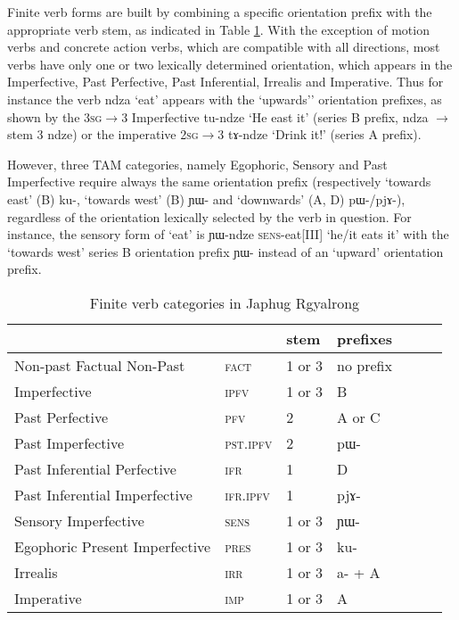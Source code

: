 \documentclass[oldfontcommands,oneside,a4paper,11pt]{article}
\newcommand{\ipa}[1]{\mbox{\phon #1}} %
\begin{document}
Finite verb forms are built by combining a specific orientation prefix with the appropriate verb stem, as indicated in Table \ref{tab:finite.forms}. With the exception of motion verbs and concrete action verbs, which are compatible with all directions, most verbs have only one or two lexically determined orientation, which appears in the Imperfective, Past Perfective, Past Inferential, Irrealis and Imperative. Thus for  instance the verb \ipa{ndza} `eat' appears with the `upwards'' orientation prefixes, as shown by the \textsc{3sg$\rightarrow$3} Imperfective \ipa{tu-ndze} `He east it' (series B prefix, \ipa{ndza} $\rightarrow$ stem 3 \ipa{ndze}) or the imperative \textsc{2sg$\rightarrow$3} \ipa{tɤ-ndze} `Drink it!' (series A prefix).

However, three TAM categories, namely Egophoric, Sensory and Past Imperfective require always the same orientation prefix (respectively `towards east' (B) \ipa{ku-}, `towards west' (B) \ipa{ɲɯ-} and `downwards' (A, D) \ipa{pɯ-}/\ipa{pjɤ-}), regardless of the orientation lexically selected by the verb in question. For instance, the sensory form of `eat' is \ipa{ɲɯ-ndze} \textsc{sens}-eat[III] `he/it eats it' with the `towards west' series B orientation prefix \ipa{ɲɯ-} instead of an `upward' orientation prefix.

\begin{table}[H]
\caption{Finite verb categories in Japhug Rgyalrong} \label{tab:finite.forms} \centering
\begin{tabular}{lllllll}
\toprule
&	&	stem&	prefixes\\
\midrule
Non-past Factual Non-Past&	\textsc{fact} &	1 or 3&	no prefix\\
Imperfective&	\textsc{ipfv} &	1 or 3&	B\\
Past Perfective &	\textsc{pfv} &	2&	A or C\\
Past Imperfective &	\textsc{pst.ipfv} &	2&	\ipa{pɯ-}\\
Past Inferential Perfective &	\textsc{ifr} &	1&	D\\
Past Inferential Imperfective&	\textsc{ifr.ipfv} &	1&	\ipa{pjɤ-}\\
Sensory Imperfective&	\textsc{sens} &	1 or 3&	\ipa{ɲɯ-}\\
Egophoric Present Imperfective&	\textsc{pres} &	1 or 3&	\ipa{ku-}\\
Irrealis&	\textsc{irr} &	1 or 3&	\ipa{a-} + A\\
Imperative&	\textsc{imp} &	1 or 3&	A\\
\bottomrule
\end{tabular}
\end{table}
\end{document}
